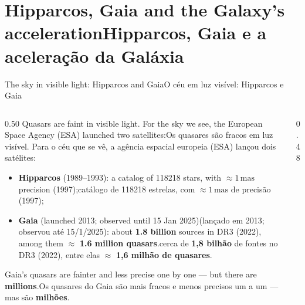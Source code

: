 \documentclass[aspectratio=169,11pt]{beamer}
\newcommand{\tr}[2]{\ifEN#2\else#1\fi}
\newcommand{\bnum}[1]{\textbf{\textcolor{mTeal}{#1}}}
\newcommand{\mas}{\ensuremath{\,\mathrm{mas}}\xspace}
\begin{document}
\section{\tr{Hipparcos, Gaia e a aceleração da Galáxia}{Hipparcos, Gaia and the Galaxy's acceleration}}

\begin{frame}{\tr{O céu em luz visível: Hipparcos e Gaia}{The sky in visible light: Hipparcos and Gaia}}
  \begin{columns}[T]
    \begin{column}{0.50\textwidth}
      \small
      \tr{Os quasares são fracos em luz visível. Para o céu que se vê, a agência espacial
      europeia (ESA) lançou dois satélites:}{Quasars are faint in visible light. For the sky we
      see, the European Space Agency (ESA) launched two satellites:}
      \smallskip
      \begin{itemize}
        \setlength{\itemsep}{1pt}
        \item \textbf{Hipparcos} (1989--1993): \tr{catálogo de \num{118218} estrelas, com
              $\approx 1\mas$ de precisão (1997);}{a catalog of \num{118218} stars, with
              $\approx 1\mas$ precision (1997);}
        \item \textbf{Gaia} \tr{(lançado em 2013; observou até 15/1/2025)}{(launched 2013; observed
              until 15 Jan 2025)}: \tr{cerca de \bnum{1,8 bilhão} de fontes no DR3 (2022), entre
              elas $\approx$ \bnum{1,6 milhão de quasares}.}{about \bnum{1.8 billion} sources in DR3
              (2022), among them $\approx$ \bnum{1.6 million quasars}.}
      \end{itemize}
      \smallskip
      \tr{Os quasares do Gaia são mais fracos e menos precisos um a um --- mas são
      \bnum{milhões}.}{Gaia's quasars are fainter and less precise one by one --- but there are
      \bnum{millions}.}
    \end{column}
    \begin{column}{0.48\textwidth}
      \centering
\end{column}
\end{columns}
\end{frame}
\end{document}

